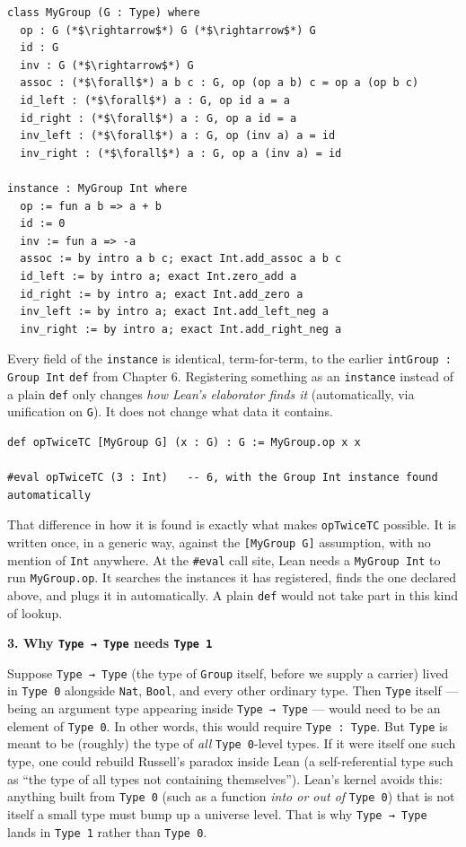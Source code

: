 \begin{lstlisting}
class MyGroup (G : Type) where
  op : G (*$\rightarrow$*) G (*$\rightarrow$*) G
  id : G
  inv : G (*$\rightarrow$*) G
  assoc : (*$\forall$*) a b c : G, op (op a b) c = op a (op b c)
  id_left : (*$\forall$*) a : G, op id a = a
  id_right : (*$\forall$*) a : G, op a id = a
  inv_left : (*$\forall$*) a : G, op (inv a) a = id
  inv_right : (*$\forall$*) a : G, op a (inv a) = id

instance : MyGroup Int where
  op := fun a b => a + b
  id := 0
  inv := fun a => -a
  assoc := by intro a b c; exact Int.add_assoc a b c
  id_left := by intro a; exact Int.zero_add a
  id_right := by intro a; exact Int.add_zero a
  inv_left := by intro a; exact Int.add_left_neg a
  inv_right := by intro a; exact Int.add_right_neg a
\end{lstlisting}

Every field of the \texttt{instance} is identical, term-for-term, to the earlier \texttt{intGroup : Group Int} \texttt{def} from Chapter 6. Registering something as an \texttt{instance} instead of a plain \texttt{def} only changes \emph{how Lean's elaborator finds it} (automatically, via unification on \texttt{G}). It does not change what data it contains.

\begin{lstlisting}
def opTwiceTC [MyGroup G] (x : G) : G := MyGroup.op x x

#eval opTwiceTC (3 : Int)   -- 6, with the Group Int instance found automatically
\end{lstlisting}

That difference in how it is found is exactly what makes \texttt{opTwiceTC} possible. It is written once, in a generic way, against the \texttt{[MyGroup G]} assumption, with no mention of \texttt{Int} anywhere. At the \texttt{\#eval} call site, Lean needs a \texttt{MyGroup Int} to run \texttt{MyGroup.op}. It searches the instances it has registered, finds the one declared above, and plugs it in automatically. A plain \texttt{def} would not take part in this kind of lookup.

\textbf{3. Why \texttt{Type → Type} needs \texttt{Type 1}}

Suppose \texttt{Type → Type} (the type of \texttt{Group} itself, before we supply a carrier) lived in \texttt{Type 0} alongside \texttt{Nat}, \texttt{Bool}, and every other ordinary type. Then \texttt{Type} itself --- being an argument type appearing inside \texttt{Type → Type} --- would need to be an element of \texttt{Type 0}. In other words, this would require \texttt{Type : Type}. But \texttt{Type} is meant to be (roughly) the type of \emph{all} \texttt{Type 0}-level types. If it were itself one such type, one could rebuild Russell's paradox inside Lean (a self-referential type such as ``the type of all types not containing themselves''). Lean's kernel avoids this: anything built from \texttt{Type 0} (such as a function \emph{into or out of} \texttt{Type 0}) that is not itself a small type must bump up a universe level. That is why \texttt{Type → Type} lands in \texttt{Type 1} rather than \texttt{Type 0}.

